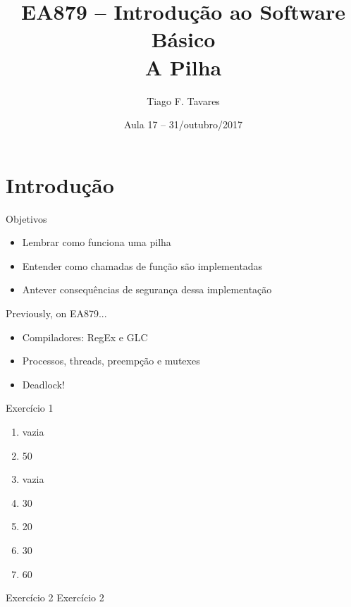 \documentclass{beamer}
\title[17-Pilha]{EA879 -- Introdução ao Software
Básico\\A Pilha}
\author{Tiago F. Tavares}
\institute{FEEC -- UNICAMP}
\date{Aula 17 -- 31/outubro/2017}
\begin{document}
\begin{frame}
  \titlepage
\end{frame}


\section{Introdução}

\begin{frame}{Objetivos}
  \Large
  \begin{itemize}
    \item Lembrar como funciona uma pilha
    \item Entender como chamadas de função são implementadas
    \item Antever consequências de segurança dessa implementação
  \end{itemize}
\end{frame}

\begin{frame}[fragile]{Previously, on EA879...}
  \centering
  \Large
  \begin{itemize}
    \item Compiladores: RegEx e GLC
    \item Processos, threads, preempção e mutexes
    \item Deadlock!
  \end{itemize}
\end{frame}

\begin{frame}[fragile]{Exercício 1}
  \centering
  \Large
  \begin{enumerate}
  \item <2-> vazia
  \item <3-> 50
  \item <4-> vazia
  \item <5-> 30
  \item <6-> 20
  \item <7-> 30
  \item <8-> 60
  \end{enumerate}

\end{frame}

\begin{frame}[fragile]{Exercício 2}
  \centering
  \Large
  Exercício 2
\end{frame}
\end{document}
